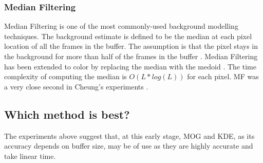 \subsubsection{Median Filtering}
Median Filtering is one of the most commonly-used background modelling techniques. The background estimate is defined to be the median at each pixel location of all the frames in the buffer. The assumption is that the pixel stays in the background for more than half of the frames in the buffer \cite{Cheung2007}. Median Filtering has been extended to color by replacing the median with the medoid \cite{Cucchiara2003}. The time complexity of computing the median is $O(L*log(L))$ for each pixel. MF was a very close second in Cheung's experiments .

\subsection{Which method is best?}
The experiments above \cite{Cheung2007,Piccardi2004} suggest that, at this early stage, MOG and KDE, as its accuracy depends on buffer size, may be of use as they are highly accurate and take linear time.\\